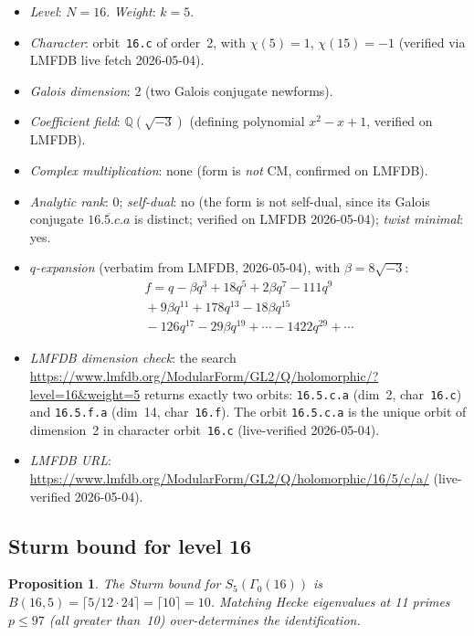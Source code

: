 \documentclass[12pt]{amsart}
\newtheorem{proposition}[theorem]{Proposition}
\theoremstyle{definition}
\newcommand{\Q}{\mathbb{Q}}
\newcommand{\Gam}{\Gamma}
\begin{document}
\begin{itemize}
  \item \emph{Level}: $N=16$. \emph{Weight}: $k=5$.
  \item \emph{Character}: orbit~\texttt{16.c} of order~2, with
    $\chi(5)=1$, $\chi(15)=-1$ (verified via LMFDB live fetch 2026-05-04).
  \item \emph{Galois dimension}: 2 (two Galois conjugate newforms).
  \item \emph{Coefficient field}: $\Q(\sqrt{-3})$ (defining polynomial
    $x^2 - x + 1$, verified on LMFDB).
  \item \emph{Complex multiplication}: none (form is \emph{not} CM,
    confirmed on LMFDB).
  \item \emph{Analytic rank}: 0; \emph{self-dual}: no
    (the form is not self-dual, since its Galois conjugate
    $\overline{16.5.c.a}$ is distinct; verified on LMFDB 2026-05-04);
    \emph{twist minimal}: yes.
  \item \emph{$q$-expansion} (verbatim from LMFDB, 2026-05-04),
    with $\beta = 8\sqrt{-3}$:
    \begin{multline*}
      f = q - \beta q^3 + 18q^5 + 2\beta q^7 - 111q^9\\
          {} + 9\beta q^{11} + 178q^{13} - 18\beta q^{15}\\
          {} - 126q^{17} - 29\beta q^{19} + \cdots - 1422q^{29} + \cdots
    \end{multline*}
  \item \emph{LMFDB dimension check}: the search
    \url{https://www.lmfdb.org/ModularForm/GL2/Q/holomorphic/?level=16&weight=5}
    returns exactly two orbits: \texttt{16.5.c.a} (dim~2, char~\texttt{16.c})
    and \texttt{16.5.f.a} (dim~14, char~\texttt{16.f}).  The orbit
    \texttt{16.5.c.a} is the unique orbit of dimension~2 in character
    orbit~\texttt{16.c} (live-verified 2026-05-04).
  \item \emph{LMFDB URL}: \url{https://www.lmfdb.org/ModularForm/GL2/Q/holomorphic/16/5/c/a/}
    (live-verified 2026-05-04).
\end{itemize}

\subsection{Sturm bound for level 16}

\begin{proposition}\label{prop:sturm-16}
  The Sturm bound for $S_5(\Gam_0(16))$ is
  $B(16,5) = \lceil 5/12\cdot 24\rceil = \lceil 10 \rceil = 10$.
  Matching Hecke eigenvalues at 11 primes $p\le 97$
  (all greater than~10) over-determines the identification.
\end{proposition}
\end{document}

